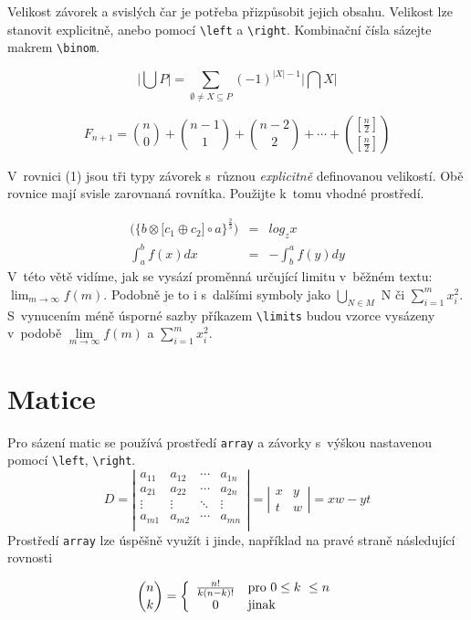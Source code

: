 \documentclass[a4paper, twocolumn, 11pt]{article}
\begin{document}
Velikost závorek a svislých čar je potřeba přizpůsobit jejich obsahu. Velikost lze stanovit explicitně,
anebo pomocí \verb|\left| a \verb|\right|. Kombinační čísla sázejte makrem \verb|\binom|.

\begin{displaymath}
    \Big|\bigcup P\Big| = \sum\limits _{\emptyset \neq X \subseteq P} (-1)^{|X|-1}\Big|\bigcap X\Big|
\end{displaymath}

\begin{displaymath}
    F_{n+1} = \binom{n}{0} + \binom{n - 1}{1} + \binom{n - 2}{2} + \cdots + \binom{[\frac{n}{2}]}{[\frac{n}{2}]}
\end{displaymath}

V~rovnici (1) jsou tři typy závorek s~různou \textit{explicitně} definovanou velikostí. Obě rovnice mají svisle zarovnaná rovnítka. Použijte k~tomu vhodné prostředí.


\begin{eqnarray}
\bigg( \Big\{b \otimes \big[ c_1 \oplus c_2 \big] \circ a \Big\}^{\frac{2}{3}} \bigg) & = & log_z x \\
\int_a^b f(x)dx & = & -\int_b^a f(y)dy
\end{eqnarray}
V~této větě vidíme, jak se vysází proměnná určující
limitu v~běžném textu: $\lim_{m \to \infty} f(m)$.
Podobně je to i s~dalšími symboly jako $\bigcup_{N\in M}$ N či $\sum\nolimits_{i=1}^m x_i^2$. 
S~vynucením méně úsporné sazby příkazem \verb|\limits| budou
vzorce vysázeny v~podobě $\lim\limits_{m \to \infty} f(m)$ a
$\sum\limits_{i=1}^m x_i^2$.

\section{Matice}
Pro sázení matic se používá prostředí \texttt{array} a závorky
s~výškou nastavenou pomocí \verb|\left|, \verb|\right|.
\[
D = \left| 
\begin{array}{cccc}
    a_{11} & a_{12} & \cdots & a_{1n} \\
    a_{21} & a_{22} & \cdots & a_{2n} \\
    \vdots & \vdots & \ddots & \vdots \\
    a_{m1} & a_{m2} & \cdots & a_{mn} \\
\end{array} 
\right| 
=
\left|
\begin{array}{cc}
    x & y \\
    t & w
\end{array}
\right|
=
xw - yt
\]
Prostředí \texttt{array} lze úspěšně využít i jinde, například
na pravé straně následující rovnosti

$$ \binom{n}{k} = \left\{
\begin{array}{c l}
\frac{n!}{k(n-k)!} & \text{pro } 0 \leq k~\leq n \\
0 & \text{jinak}
\end{array} \right. $$
\end{document}

